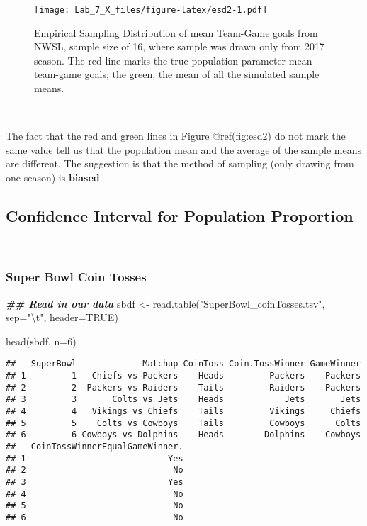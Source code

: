 \documentclass[
]{article}
\newenvironment{Shaded}{\begin{snugshade}}{\end{snugshade}}
\newcommand{\AttributeTok}[1]{\textcolor[rgb]{0.77,0.63,0.00}{#1}}
\newcommand{\ConstantTok}[1]{\textcolor[rgb]{0.00,0.00,0.00}{#1}}
\newcommand{\DecValTok}[1]{\textcolor[rgb]{0.00,0.00,0.81}{#1}}
\newcommand{\DocumentationTok}[1]{\textcolor[rgb]{0.56,0.35,0.01}{\textbf{\textit{#1}}}}
\newcommand{\FunctionTok}[1]{\textcolor[rgb]{0.00,0.00,0.00}{#1}}
\newcommand{\NormalTok}[1]{#1}
\newcommand{\OtherTok}[1]{\textcolor[rgb]{0.56,0.35,0.01}{#1}}
\newcommand{\SpecialCharTok}[1]{\textcolor[rgb]{0.00,0.00,0.00}{#1}}
\newcommand{\StringTok}[1]{\textcolor[rgb]{0.31,0.60,0.02}{#1}}
\begin{document}
\begin{figure}
\centering
\texttt{[image: Lab\_7\_X\_files/figure-latex/esd2-1.pdf]}
\caption{Empirical Sampling Distribution of mean Team-Game goals from
NWSL, sample size of 16, where sample was drawn only from 2017 season.
The red line marks the true population parameter mean team-game goals;
the green, the mean of all the simulated sample means.}
\end{figure}

~~

The fact that the red and green lines in Figure @ref(fig:esd2) do not
mark the same value tell us that the population mean and the average of
the sample means are different. The suggestion is that the method of
sampling (only drawing from one season) is \textbf{biased}.

\newpage

\hypertarget{confidence-interval-for-population-proportion}{%
\subsection{Confidence Interval for Population
Proportion}\label{confidence-interval-for-population-proportion}}

~~

\hypertarget{super-bowl-coin-tosses}{%
\subsubsection{Super Bowl Coin Tosses}\label{super-bowl-coin-tosses}}

\begin{Shaded}
\begin{Highlighting}[]
\DocumentationTok{\#\# Read in our data}
\NormalTok{sbdf }\OtherTok{\textless{}{-}} \FunctionTok{read.table}\NormalTok{(}\StringTok{"SuperBowl\_coinTosses.tsv"}\NormalTok{, }\AttributeTok{sep=}\StringTok{"}\SpecialCharTok{\textbackslash{}t}\StringTok{"}\NormalTok{, }\AttributeTok{header=}\ConstantTok{TRUE}\NormalTok{)}

\FunctionTok{head}\NormalTok{(sbdf, }\AttributeTok{n=}\DecValTok{6}\NormalTok{)}
\end{Highlighting}
\end{Shaded}

\begin{verbatim}
##   SuperBowl             Matchup CoinToss Coin.TossWinner GameWinner
## 1         1   Chiefs vs Packers    Heads         Packers    Packers
## 2         2  Packers vs Raiders    Tails         Raiders    Packers
## 3         3       Colts vs Jets    Heads            Jets       Jets
## 4         4   Vikings vs Chiefs    Tails         Vikings     Chiefs
## 5         5    Colts vs Cowboys    Tails         Cowboys      Colts
## 6         6 Cowboys vs Dolphins    Heads        Dolphins    Cowboys
##   CoinTossWinnerEqualGameWinner.
## 1                            Yes
## 2                             No
## 3                            Yes
## 4                             No
## 5                             No
## 6                             No
\end{verbatim}
\end{document}
